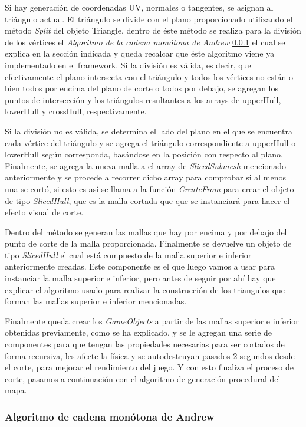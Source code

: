 Si hay generación de coordenadas UV, normales o tangentes, se asignan al triángulo actual. El triángulo se divide con el plano proporcionado utilizando el método \textit{Split} del objeto Triangle, dentro de éste método se realiza para la división de los vértices el \textit{Algoritmo de la cadena monótona de Andrew} \ref{subsubsec:Andrew} el cual se explica en la sección indicada y queda recalcar que éste algoritmo viene ya implementado en el framework. Si la división es válida, es decir, que efectivamente el plano intersecta con el triángulo y todos los vértices no están o bien todos por encima del plano de corte o todos por debajo, se agregan los puntos de intersección y los triángulos resultantes a los arrays de upperHull, lowerHull y crossHull, respectivamente.

Si la división no es válida, se determina el lado del plano en el que se encuentra cada vértice del triángulo y se agrega el triángulo correspondiente a upperHull o lowerHull según corresponda, basándose en la posición con respecto al plano. Finalmente, se agrega la nueva malla a el array de \textit{SlicedSubmesh} mencionado anteriormente y se procede a recorrer dicho array para comprobar si al menos una se cortó, si esto es así se llama a la función \textit{CreateFrom} para crear el objeto de tipo \textit{SlicedHull}, que es la malla cortada que que se instanciará para hacer el efecto visual de corte.

Dentro del método se generan las mallas que hay por encima y por debajo del punto de corte de la malla proporcionada. Finalmente se devuelve un objeto de tipo \textit{SlicedHull} el cual está compuesto de la malla superior e inferior anteriormente creadas. Este componente es el que luego vamos a usar para instanciar la malla superior e inferior, pero antes de seguir por ahí hay que explicar el algoritmo usado para realizar la construcción de los triangulos que forman las mallas superior e inferior mencionadas.

Finalmente queda crear los \textit{GameObjects} a partir de las mallas superior e inferior obtenidas previamente, como se ha explicado, y se le agregan una serie de componentes para que tengan las propiedades necesarias para ser cortados de forma recursiva, les afecte la física y se autodestruyan pasados 2 segundos desde el corte, para mejorar el rendimiento del juego. Y con esto finaliza el proceso de corte, pasamos a continuación con el algoritmo de generación procedural del mapa.

\subsubsection{Algoritmo de cadena monótona de Andrew} 
\label{subsubsec:Andrew}

